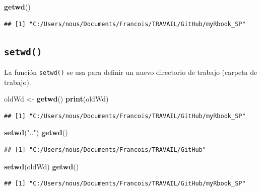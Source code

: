 \documentclass[
]{book}
\newenvironment{Shaded}{\begin{snugshade}}{\end{snugshade}}
\newcommand{\KeywordTok}[1]{\textcolor[rgb]{0.13,0.29,0.53}{\textbf{#1}}}
\newcommand{\NormalTok}[1]{#1}
\newcommand{\StringTok}[1]{\textcolor[rgb]{0.31,0.60,0.02}{#1}}
\begin{document}
\begin{Shaded}
\begin{Highlighting}[]
\KeywordTok{getwd}\NormalTok{()}
\end{Highlighting}
\end{Shaded}

\begin{verbatim}
## [1] "C:/Users/nous/Documents/Francois/TRAVAIL/GitHub/myRbook_SP"
\end{verbatim}

\hypertarget{l015setwd}{%
\subsection{\texorpdfstring{\texttt{setwd()}}{setwd()}}\label{l015setwd}}

La función \texttt{setwd()} se usa para definir un nuevo directorio de trabajo (carpeta de trabajo).

\begin{Shaded}
\begin{Highlighting}[]
\NormalTok{oldWd <-}\StringTok{ }\KeywordTok{getwd}\NormalTok{()}
\KeywordTok{print}\NormalTok{(oldWd)}
\end{Highlighting}
\end{Shaded}

\begin{verbatim}
## [1] "C:/Users/nous/Documents/Francois/TRAVAIL/GitHub/myRbook_SP"
\end{verbatim}

\begin{Shaded}
\begin{Highlighting}[]
\KeywordTok{setwd}\NormalTok{(}\StringTok{".."}\NormalTok{)}
\KeywordTok{getwd}\NormalTok{()}
\end{Highlighting}
\end{Shaded}

\begin{verbatim}
## [1] "C:/Users/nous/Documents/Francois/TRAVAIL/GitHub"
\end{verbatim}

\begin{Shaded}
\begin{Highlighting}[]
\KeywordTok{setwd}\NormalTok{(oldWd)}
\KeywordTok{getwd}\NormalTok{()}
\end{Highlighting}
\end{Shaded}

\begin{verbatim}
## [1] "C:/Users/nous/Documents/Francois/TRAVAIL/GitHub/myRbook_SP"
\end{verbatim}
\end{document}
